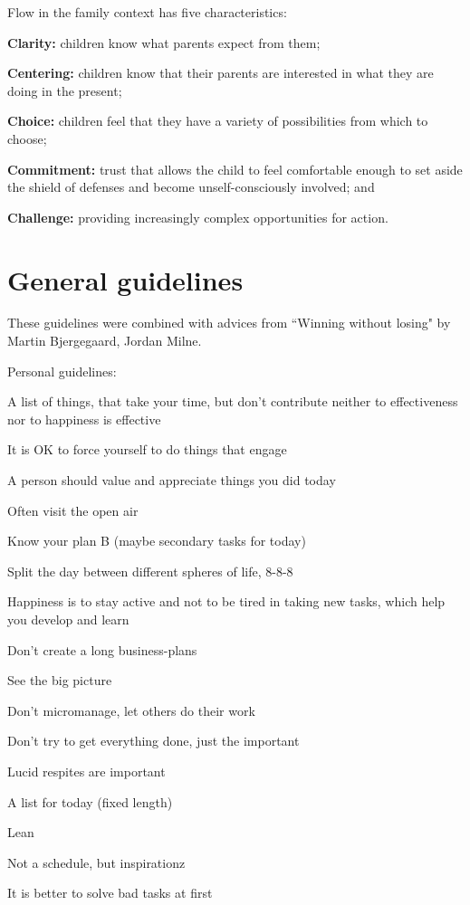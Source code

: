 Flow in the family context has five characteristics:
\begin{compactitem}
\item \textbf{Clarity:} children know what parents expect from them; 
\item \textbf{Centering:} children know that their parents are interested in what they are doing in the present;
\item \textbf{Choice:} children feel that they have a variety of possibilities from which to choose;
\item \textbf{Commitment:} trust that allows the child to feel comfortable enough to set aside the shield of defenses and become unself-consciously involved; and
\item \textbf{Challenge:} providing increasingly complex opportunities for action.
\end{compactitem}

\section{General guidelines}

These guidelines were combined with advices from ``Winning without losing" by Martin Bjergegaard, Jordan Milne.

Personal guidelines:

\begin{compactenum}

\item A list of things, that take your time, but don't contribute neither to effectiveness nor to happiness is effective
\item It is OK to force yourself to do things that engage
\item A person should value and appreciate things you did today
\item Often visit the open air
\item Know your plan B (maybe secondary tasks for today)
\item Split the day between different spheres of life, 8-8-8
\item Happiness is to stay active and not to be tired in taking new tasks, which help you develop and learn
\item Don't create a long business-plans
\item See the big picture
\item Don't micromanage, let others do their work
\item Don't try to get everything done, just the important
\item Lucid respites are important
\item A list for today (fixed length)
\item Lean
\item Not a schedule, but inspirationz
\item It is better to solve bad tasks at first

\end{compactenum}

